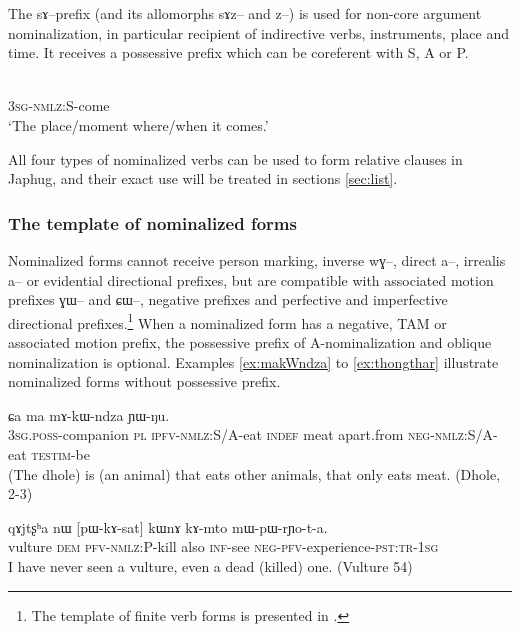 \documentclass[oldfontcommands,oneside,a4paper,11pt]{article}
\newcommand{\ipa}[1]{{\phon #1}} %
\newcommand{\topic}{\textsc{dem}}
\begin{document}
The \ipa{sɤ}--prefix (and its allomorphs \ipa{sɤz}-- and \ipa{z}--) is used for non-core argument nominalization, in particular   recipient of indirective verbs, instruments, place and time. It receives a possessive prefix  which can be coreferent with S, A or P.

   \begin{exe}
\ex \label{ex:come}
\gll \ipa{ɯ-sɤ-ɣi}    \\
   \textsc{3sg-nmlz}:S-come \\
 \glt  `The place/moment where/when it comes.'
 \end{exe}
 
 All four types of nominalized verbs can be used to form relative clauses in Japhug, and their exact use will be treated in sections \ref{sec:list}.
 
 \subsubsection{The template of nominalized forms}
 
Nominalized forms cannot receive person marking, inverse \ipa{wɣ}--, direct \ipa{a}--, irrealis \ipa{a}-- or evidential directional prefixes, but are compatible with associated motion prefixes \ipa{ɣɯ}-- and \ipa{ɕɯ}--, negative prefixes and perfective and imperfective directional prefixes.\footnote{The template of finite verb forms is presented in \citet{jacques13harmonization}.} When a nominalized form has a negative, TAM or associated motion prefix, the possessive prefix of A-nominalization and oblique nominalization is optional. Examples \ref{ex:makWndza} to \ref{ex:thongthar} illustrate nominalized forms without possessive prefix.
 

    \begin{exe}
\ex \label{ex:makWndza}
\gll
[\ipa{ɯ-zda}  	\ipa{ra}  	\ipa{cʰɯ-kɯ-ndza}]  	\ipa{ci,}  	\ipa{ɕa}  	\ipa{ma}  	\ipa{mɤ-kɯ-ndza}  	\ipa{ɲɯ-ŋu.}  	 \\
\textsc{3sg.poss}-companion  \textsc{pl} \textsc{ipfv-nmlz}:S/A-eat \textsc{indef} meat apart.from \textsc{neg-nmlz}:S/A-eat \textsc{testim}-be \\
\glt (The dhole) is (an animal) that eats other animals, that only eats meat. (Dhole, 2-3)
 \end{exe}
     \begin{exe}
\ex \label{ex:kill4}
\gll
\ipa{qɤjtʂʰa}  	\ipa{nɯ}  	[\ipa{pɯ-kɤ-sat}]  	\ipa{kɯnɤ}  	\ipa{kɤ-mto}  	\ipa{mɯ-pɯ-rɲo-t-a.}  \\
vulture \topic{} \textsc{pfv-nmlz:P}-kill  also \textsc{inf}-see \textsc{neg-pfv}-experience-\textsc{pst:tr-1sg} \\
\glt I have never seen a vulture, even a dead (killed) one. (Vulture 54)
 \end{exe}
  
\end{document}
